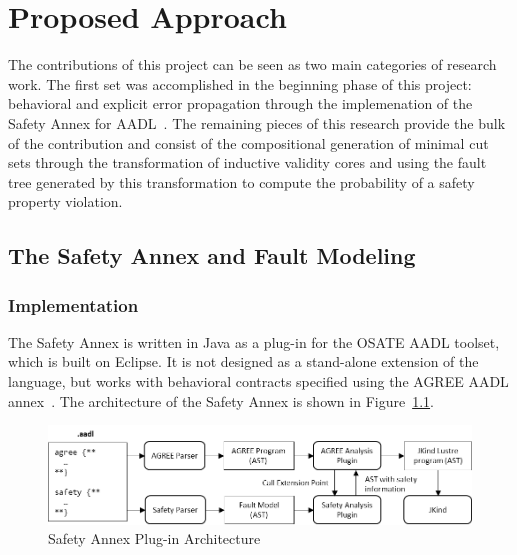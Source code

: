 \chapter{Proposed Approach}
\label{ch:prop}

The contributions of this project can be seen as two main categories of research work. The first set was accomplished in the beginning phase of this project: behavioral and explicit error propagation through the implemenation of the Safety Annex for AADL~\cite{Stewart17:IMBSA,stewart2020safety}. The remaining pieces of this research provide the bulk of the contribution and consist of the compositional generation of minimal cut sets through the transformation of inductive validity cores and using the fault tree generated by this transformation to compute the probability of a safety property violation. 

\section{The Safety Annex and Fault Modeling}
\subsection{Implementation}
The Safety Annex is written in Java as a plug-in for the OSATE AADL toolset, which is built on Eclipse.  It is not designed as a stand-alone extension of the language, but works with behavioral contracts specified using the AGREE AADL annex~\cite{NFM2012:CoGaMiWhLaLu}. 
The architecture of the Safety Annex is shown in Figure~\ref{fig:plugin-arch}.

\begin{figure}[h!]
	\begin{center}
		\includegraphics[width=\textwidth]{images/arch.png}
	\end{center}
	\caption{Safety Annex Plug-in Architecture}
	\label{fig:plugin-arch}
\end{figure}

